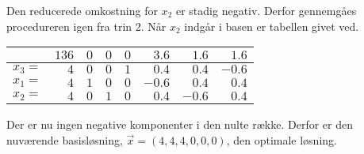 \begin{eks}
Den reducerede omkostning for $x_2$ er stadig negativ. Derfor gennemgåes procedureren igen fra trin 2. Når $x_2$ indgår i basen er tabellen givet ved. 
\begin{center}
\begin{tabular}{r| r|r r r r r r|}
  \hline	
  &$136$&$0$ &$0$&$0$&$3.6$&$1.6$&$1.6$\\ \hline	
  $x_3=$&$4$&$0$&$0$&$1$&$0.4$&$0.4$&$-0.6$\\	
  $x_1=$&$4$&$1$&$0$&$0$&$-0.6$&$0.4$&$0.4$\\
  $x_2=$&$4$&$0$&$1$&$0$&$0.4$&$-0.6$&$0.4$\\
   \hline
\end{tabular}
\end{center}
Der er nu ingen negative komponenter i den nulte række. Derfor er den nuværende basisløsning, $\vec{x}=(4,4,4,0,0,0)$, den optimale løsning. 
\end{eks}

